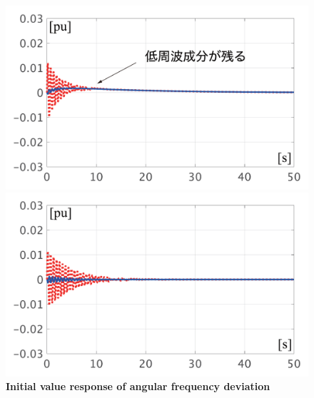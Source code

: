 \documentclass[graybox, envcountchap]{svmult}
\begin{document}
\begin{figure}[t]
  \centering
  {
  \begin{minipage}{0.49\linewidth}
    \centering
    \includegraphics[width = 1.0\linewidth]{figs/woAVRsmall}
  \end{minipage}
  \begin{minipage}{0.49\linewidth}
    \centering
    \includegraphics[width = 1.0\linewidth]{figs/wAVRsmall}
  \end{minipage}
  \medskip
  \caption{\textbf{Initial value response of angular frequency deviation}
  \\ 
  }
  \label{fig:avrsmalld}
  }
\medskip
\end{figure}
\end{document}
